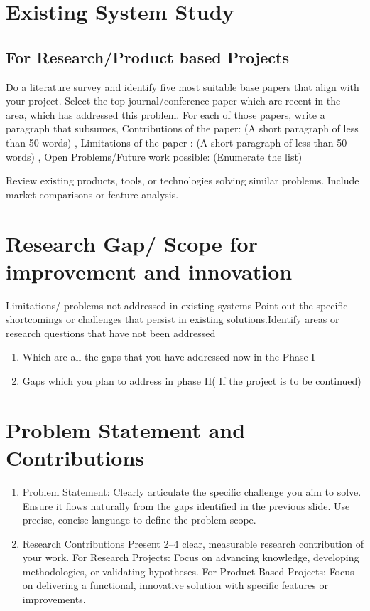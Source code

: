 \label{chap.2}


\section{Existing System Study}

\subsection{For Research/Product based Projects}

Do a literature survey and identify five most suitable base papers that align with your project. Select the top journal/conference paper which are recent in the area, which has addressed this problem. For each of those papers, write a
paragraph that subsumes, Contributions of the paper: (A short paragraph of less than 50 words) , Limitations of the paper : (A short paragraph of less than 50 words) , Open Problems/Future work possible: (Enumerate the list) 

Review existing products, tools, or technologies solving similar problems.
Include market comparisons or feature analysis.

\section{Research Gap/ Scope for improvement and innovation}

Limitations/ problems not addressed in existing systems Point out the specific shortcomings or challenges that persist in existing solutions.Identify areas or research questions that have not been addressed
\begin{enumerate}
    \item Which are all the gaps that you have addressed now in the Phase I
    \item Gaps which you plan to address in phase II( If the project is to be continued)
\end{enumerate}


\section{Problem Statement and Contributions}

\begin{enumerate}
    \item Problem Statement: Clearly articulate the specific challenge you aim to solve. Ensure it flows naturally from the gaps identified in the previous slide. Use precise, concise language to define the problem scope.
    \item  Research Contributions Present 2–4 clear, measurable research contribution of your work. For Research Projects: Focus on advancing knowledge, developing methodologies, or validating hypotheses. For Product-Based Projects: Focus on delivering a functional, innovative solution with specific features or improvements.
\end{enumerate}
